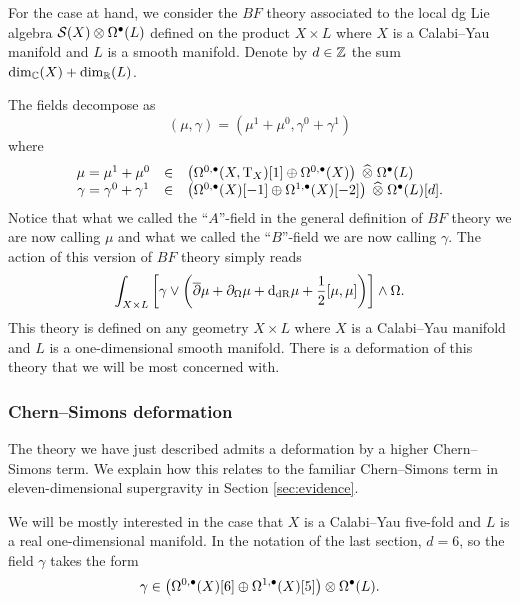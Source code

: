 \documentclass[11pt]{amsart}
\def\T{{\rm T}}
\begin{document}
For the case at hand, we consider the $BF$ theory associated to the local dg Lie algebra  $\mathcal S(X) \otimes \Omega^\bullet(L)$ defined on the product $X \times L$ where $X$ is a Calabi--Yau manifold and $L$ is a smooth manifold.
Denote by $d \in \mathbb Z$ the sum $\dim_{\mathbb C}(X) + \dim_{\mathbb R}(L)$.

The fields decompose as
\[
(\mu, \gamma) = (\mu^1 + \mu^0, \gamma^0 + \gamma^1)
\]
where
\[
  \begin{array}{ccl}
    \mu = \mu^1+\mu^0 & \in & \left(\Omega^{0,\bu}(X, \T_X)[1] \oplus \Omega^{0,\bu}(X) \right) \; \Hat{\otimes} \; \Omega^{\bu}(L) \\
    \gamma = \gamma^0 + \gamma^1 & \in & \left(\Omega^{0,\bu}(X)[-1] \oplus \Omega^{1,\bu}(X)[-2] \right) \; \Hat{\otimes}\; \Omega^{\bu}(L)[d] .
  \end{array}
\]
Notice that what we called the ``$A$''-field in the general definition of $BF$ theory we are now calling $\mu$ and what we called the ``$B$''-field we are now calling $\gamma$.
The action of this version of $BF$ theory simply reads 
\[
\int_{X \times L} \left[\gamma \vee \left(\overline{\partial} \mu + \partial_\Omega \mu + {\rm d}_{{\rm dR}} \mu + \frac12 [\mu, \mu] \right) \right] \wedge \Omega .
\]
This theory is defined on any geometry $X \times L$ where $X$ is a Calabi--Yau manifold and $L$ is a one-dimensional smooth manifold.
There is a deformation of this theory that we will be most concerned with.



\subsubsection{Chern--Simons deformation}
The theory we have just described admits a deformation by a higher Chern--Simons term.
We explain how this relates to the familiar Chern--Simons term in eleven-dimensional supergravity in Section \ref{sec:evidence}.

We will be mostly interested in the case that $X$ is a Calabi--Yau five-fold and $L$ is a real one-dimensional manifold.
In the notation of the last section, $d = 6$, so the field $\gamma$ takes the form
\[
  \gamma \in \left(\Omega^{0,\bullet}(X)[6] \oplus \Omega^{1,\bullet}(X)[5] \right) \otimes \Omega^\bullet(L).
\]
\end{document}
